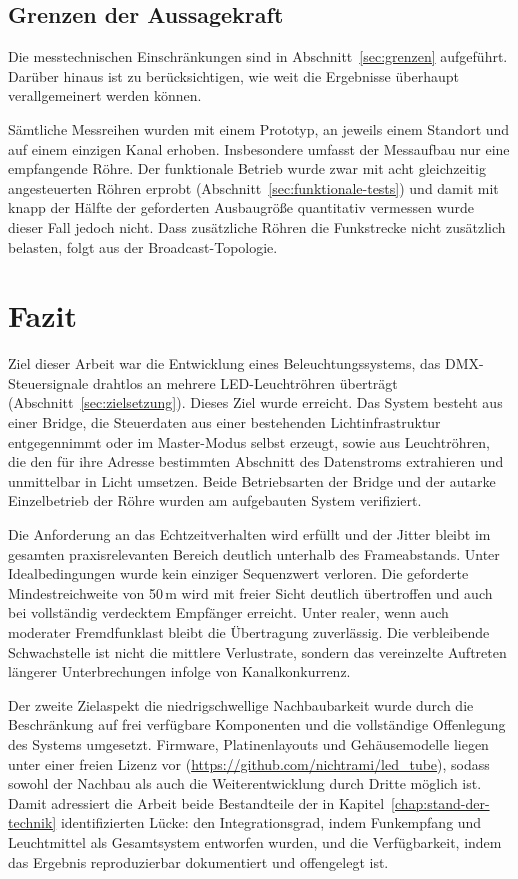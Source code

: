 \subsection{Grenzen der Aussagekraft}
\label{subsec:diskussion-aussagekraft}

Die messtechnischen Einschränkungen sind in Abschnitt~\ref{sec:grenzen}
aufgeführt. Darüber hinaus ist zu berücksichtigen, wie weit die Ergebnisse
überhaupt verallgemeinert werden können.

Sämtliche Messreihen wurden mit einem Prototyp, an jeweils einem Standort und auf
einem einzigen Kanal erhoben. Insbesondere umfasst der Messaufbau nur eine
empfangende Röhre. Der funktionale Betrieb wurde zwar mit acht gleichzeitig
angesteuerten Röhren erprobt (Abschnitt~\ref{sec:funktionale-tests}) und damit
mit knapp der Hälfte der geforderten Ausbaugröße quantitativ vermessen wurde
dieser Fall jedoch nicht. Dass zusätzliche Röhren die Funkstrecke nicht
zusätzlich belasten, folgt aus der Broadcast-Topologie.

\section{Fazit}
\label{sec:fazit}

Ziel dieser Arbeit war die Entwicklung eines Beleuchtungssystems, das
DMX-Steuersignale drahtlos an mehrere LED-Leuchtröhren überträgt
(Abschnitt~\ref{sec:zielsetzung}). Dieses Ziel wurde erreicht. Das System besteht
aus einer Bridge, die Steuerdaten aus einer bestehenden Lichtinfrastruktur
entgegennimmt oder im Master-Modus selbst erzeugt, sowie aus Leuchtröhren, die
den für ihre Adresse bestimmten Abschnitt des Datenstroms extrahieren und
unmittelbar in Licht umsetzen. Beide Betriebsarten der Bridge und der autarke
Einzelbetrieb der Röhre wurden am aufgebauten System verifiziert.

Die Anforderung an das Echtzeitverhalten wird erfüllt und der Jitter bleibt im gesamten
praxisrelevanten Bereich deutlich unterhalb des Frameabstands. Unter
Idealbedingungen wurde kein einziger Sequenzwert verloren. Die geforderte
Mindestreichweite von 50\,m wird mit freier Sicht deutlich übertroffen und auch
bei vollständig verdecktem Empfänger erreicht. Unter realer, wenn auch moderater
Fremdfunklast bleibt die Übertragung zuverlässig. Die verbleibende Schwachstelle
ist nicht die mittlere Verlustrate, sondern das vereinzelte Auftreten längerer
Unterbrechungen infolge von Kanalkonkurrenz.

Der zweite Zielaspekt die niedrigschwellige Nachbaubarkeit wurde durch die
Beschränkung auf frei verfügbare Komponenten und die vollständige Offenlegung des
Systems umgesetzt. Firmware, Platinenlayouts und Gehäusemodelle liegen unter einer
freien Lizenz vor (\url{https://github.com/nichtrami/led_tube}), sodass sowohl der
Nachbau als auch die Weiterentwicklung durch Dritte möglich ist. Damit adressiert die Arbeit beide Bestandteile der in
Kapitel~\ref{chap:stand-der-technik} identifizierten Lücke: den Integrationsgrad,
indem Funkempfang und Leuchtmittel als Gesamtsystem entworfen wurden, und die
Verfügbarkeit, indem das Ergebnis reproduzierbar dokumentiert und offengelegt ist.

